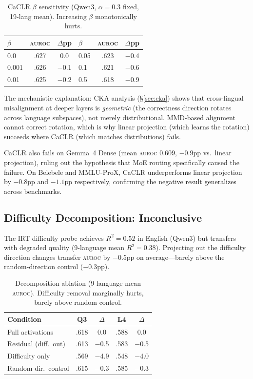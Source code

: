 \documentclass[11pt,a4paper]{article}
\newcommand{\auroc}{\textsc{auroc}}
\begin{document}
\begin{table}[t]
\centering
\small
\begin{tabular}{@{}lcclcc@{}}
\toprule
$\beta$ & \textbf{\auroc{}} & $\Delta$pp & $\beta$ & \textbf{\auroc{}} & $\Delta$pp \\
\midrule
0.0 & .627 & 0.0 & 0.05 & .623 & $-$0.4 \\
0.001 & .626 & $-$0.1 & 0.1 & .621 & $-$0.6 \\
0.01 & .625 & $-$0.2 & 0.5 & .618 & $-$0.9 \\
\bottomrule
\end{tabular}
\caption{CaCLR $\beta$ sensitivity (Qwen3, $\alpha = 0.3$ fixed, 19-lang mean). Increasing $\beta$ monotonically hurts.}
\label{tab:beta_sweep}
\end{table}

The mechanistic explanation: CKA analysis (\S\ref{sec:cka}) shows that cross-lingual misalignment at deeper layers is \emph{geometric} (the correctness direction rotates across language subspaces), not merely distributional. MMD-based alignment cannot correct rotation, which is why linear projection (which learns the rotation) succeeds where CaCLR (which matches distributions) fails.

CaCLR also fails on Gemma~4 Dense (mean \auroc{} 0.609, $-0.9$pp vs.\ linear projection), ruling out the hypothesis that MoE routing specifically caused the failure. On Belebele and MMLU-ProX, CaCLR underperforms linear projection by $-0.8$pp and $-1.1$pp respectively, confirming the negative result generalizes across benchmarks.

\subsection{Difficulty Decomposition: Inconclusive}
\label{sec:decomposition}

The IRT difficulty probe achieves $R^2 = 0.52$ in English (Qwen3) but transfers with degraded quality (9-language mean $R^2 = 0.38$). Projecting out the difficulty direction changes transfer \auroc{} by $-0.5$pp on average---barely above the random-direction control ($-0.3$pp).

\begin{table}[t]
\centering
\small
\begin{tabular}{@{}lcccc@{}}
\toprule
\textbf{Condition} & \textbf{Q3} & \textbf{$\Delta$} & \textbf{L4} & \textbf{$\Delta$} \\
\midrule
Full activations & .618 & 0.0 & .588 & 0.0 \\
Residual (diff.\ out) & .613 & $-$0.5 & .583 & $-$0.5 \\
Difficulty only & .569 & $-$4.9 & .548 & $-$4.0 \\
Random dir.\ control & .615 & $-$0.3 & .585 & $-$0.3 \\
\bottomrule
\end{tabular}
\caption{Decomposition ablation (9-language mean \auroc{}). Difficulty removal marginally hurts, barely above random control.}
\label{tab:decomp}
\end{table}
\end{document}
